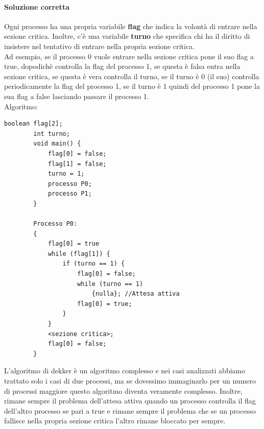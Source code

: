 \documentclass[12pt, letterpaper]{report}
\begin{document}
	\paragraph{Soluzione corretta}
	Ogni processo ha una propria variabile \textbf{flag} che indica la volontà di entrare nella sezione critica. Inoltre, c'è una variabile \textbf{turno} che specifica chi ha il diritto di insistere nel tentativo di entrare nella propria sezione critica. \\
	Ad esempio, se il processo 0 vuole entrare nella sezione critica pone il suo flag a true, dopodichè controlla la flag del processo 1, se questa è falsa entra nella sezione critica, se questa è vera controlla il turno, se il turno è 0 (il suo) controlla periodicamente la flag del processo 1, se il turno è 1 quindi del processo 1 pone la sua flag a false lasciando passare il processo 1. \\
	Algoritmo:
	\begin{lstlisting}[style=pascalstyle]
		boolean flag[2];
		int turno;
		void main() {
			flag[0] = false;
			flag[1] = false;
			turno = 1;
			processo P0;
			processo P1;
		}

		Processo P0:
		{
			flag[0] = true
			while (flag[1]) {
				if (turno == 1) {
					flag[0] = false;
					while (turno == 1)
						{nulla}; //Attesa attiva
					flag[0] = true;
				}
			}
			<sezione critica>;
			flag[0] = false;
		}
	\end{lstlisting}
	L'algoritmo di dekker è un algoritmo complesso e nei casi analizzati abbiamo trattato solo i casi di due processi, ma se dovessimo immaginarlo per un numero di processi maggiore questo algoritmo diventa veramente complesso. Inoltre, rimane sempre il problema dell'attesa attiva quando un processo controlla il flag dell'altro processo se pari a true e rimane sempre il problema che se un processo fallisce nella propria sezione critica l'altro rimane bloccato per sempre.
\end{document}
